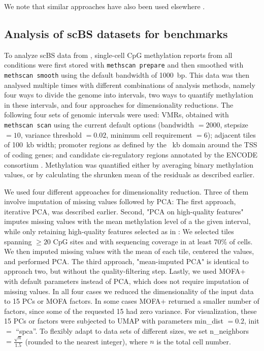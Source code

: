 \documentclass[10pt]{article}
\begin{document}
We note that similar approaches have also been used elsewhere \citep{josse2012}.


\subsection*{Analysis of scBS datasets for benchmarks}
To analyze scBS data from \citet{kremer_scnmt}, single-cell CpG methylation reports from all conditions were first stored with \texttt{methscan prepare} and then smoothed with \texttt{methscan smooth} using the default bandwidth of 1000~bp.
This data was then analysed multiple times with different combinations of analysis methods, namely four ways to divide the genome into intervals, two ways to quantify methylation in these intervals, and four approaches for dimensionality reductions.
The following four sets of genomic intervals were used:
VMRs, obtained with \texttt{methscan scan} using the current default options (bandwidth $=2000$, stepsize $=10$, variance threshold $= 0.02$, minimum cell requirement $=6$);
adjacent tiles of 100~kb width;
promoter regions as defined by the ~kb domain around the TSS of coding genes;
and candidate cis-regulatory regions annotated by the ENCODE consortium \citep{encode2020expanded}.
Methylation was quantified either by averaging binary methylation values, or by calculating the shrunken mean of the residuals as described earlier.

We used four different approaches for dimensionality reduction. Three of them involve imputation of missing values followed by PCA:
The first approach, iterative PCA, was described earlier.
Second, "PCA on high-quality features" imputes missing values with the mean methylation level of a the given interval, while only retaining high-quality features selected as in \citet{luo2017single}:
We selected tiles spanning $\ge20$ CpG sites and with sequencing coverage in at least 70\% of cells.
We then imputed missing values with the mean of each tile, centered the values, and performed PCA.
The third approach, "mean-imputed PCA" is identical to approach two, but without the quality-filtering step.
Lastly, we used MOFA+ with default parameters instead of PCA, which does not require imputation of missing values. 
In all four cases we reduced the dimensionality of the input data to 15 PCs or MOFA factors. In some cases MOFA+ returned a smaller number of factors, since some of the requested 15 had zero variance.
For visualization, these 15 PCs or factors were subjected to UMAP with parameters min\_dist $=0.2$, init $=$ ``spca''.
To flexibly adapt to data sets of different sizes, we set n\_neighbors  $=\frac{\sqrt{n}}{1.5}$ (rounded to the nearest integer), where $n$ is the total cell number.
\end{document}
